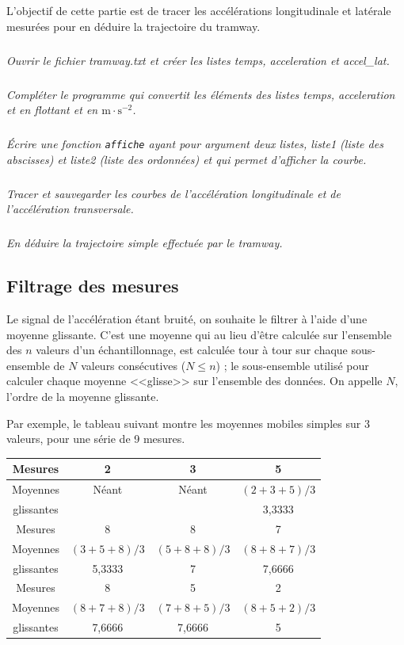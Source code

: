 \documentclass[10pt,fleqn]{article} %
\begin{document}
\begin{multicols}{2}
L’objectif de cette partie est de tracer les accélérations longitudinale et latérale mesurées pour en déduire la trajectoire du tramway.

\subparagraph{}
\textit{Ouvrir le fichier tramway.txt et créer les listes temps, acceleration et accel\_lat.}

\subparagraph{}
\textit{Compléter le programme qui convertit les éléments des listes temps, acceleration et  en flottant et en $\text{m}\cdot \text{s}^{-2}$.}

\subparagraph{}
\textit{Écrire une fonction \texttt{affiche} ayant pour argument deux listes, liste1 (liste des abscisses) et liste2 (liste des ordonnées) et qui permet d’afficher la courbe.}

\subparagraph{}
\textit{Tracer et sauvegarder les courbes de l’accélération longitudinale et de l’accélération transversale.}

\subparagraph{}
\textit{En déduire la trajectoire simple effectuée par le tramway.}

\subsection*{Filtrage des mesures}
Le signal de l’accélération étant bruité, on souhaite le filtrer à l’aide d’une moyenne glissante. C’est une moyenne qui au lieu d’être calculée sur l’ensemble des $n$ valeurs d’un échantillonnage, est calculée tour à tour sur chaque sous-ensemble de $N$ valeurs consécutives ($N \leq n$) ; le sous-ensemble utilisé pour calculer chaque moyenne <<glisse>> sur l’ensemble des données. On appelle $N$, l’ordre de la moyenne glissante.

Par exemple, le tableau suivant montre les moyennes mobiles simples sur 3 valeurs, pour une série de 9 mesures.
\begin{center}
\footnotesize{
\begin{tabular}{|c|c|c|c|}
\hline
Mesures & 2 & 3 & 5  \\
\hline
Moyennes  & Néant & Néant & $(2+3+5)/3$   \\
glissantes & & & 3,3333 \\
\hline
\hline
Mesures & 8 & 8 & 7 \\
\hline
Moyennes  & $(3+5+8)/3$ & $(5+8+8)/3$ & $(8+8+7)/3$  \\
glissantes & 5,3333  &  7 &  7,6666\\
\hline
\hline
Mesures & 8 & 5 & 2   \\
\hline
Moyennes    &  $(8+7+8)/3$ & $(7+8+5)/3$ & $(8+5+2)/3$ \\
glissantes & 7,6666 & 7,6666 & 5 \\
\hline
\end{tabular}}
\end{center}


\end{multicols}
\end{document}
